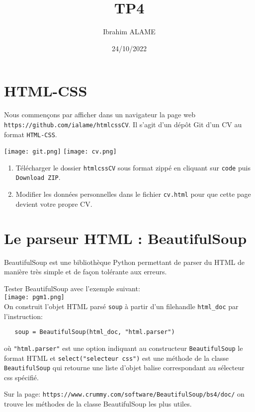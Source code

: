 \documentclass[a4paper]{article}
\title{TP4}
\author{Ibrahim ALAME}
\date{24/10/2022}
\begin{document}
\maketitle
\section{HTML-CSS}%
Nous commençons par afficher dans un navigateur la page web  {\tt https://github.com/ialame/htmlcssCV}. Il s'agit d'un dépôt Git d'un CV au format {\tt HTML-CSS}.

\begin{center}
\texttt{[image: git.png]} 
\texttt{[image: cv.png]} 
\end{center}


\begin{enumerate}
\item Télécharger le dossier {\tt htmlcssCV} sous format zippé en cliquant sur {\tt code} puis {\tt Download ZIP}.
\item Modifier les données personnelles dans le fichier {\tt cv.html}  pour que cette page devient votre propre CV.
\end{enumerate}

\section{Le parseur HTML : BeautifulSoup}
BeautifulSoup est une bibliothèque Python permettant de parser du HTML de manière très simple et de façon tolérante aux erreurs. 

Tester BeautifulSoup avec l'exemple suivant:
\\
\texttt{[image: pgm1.png]} 
\\
On construit l'objet HTML parsé {\tt soup} à partir d'un filehandle  {\tt html\_doc} par l'instruction: 
\begin{verbatim}
   soup = BeautifulSoup(html_doc, "html.parser")
\end{verbatim}
où {\tt "html.parser"} est une option indiquant au constructeur {\tt BeautifulSoup} le format HTML et {\tt select("selecteur css")} est une méthode de la classe {\tt BeautifulSoup} qui retourne une liste d'objet balise correspondant au sélecteur css spécifié.  

Sur la page: {\tt https://www.crummy.com/software/BeautifulSoup/bs4/doc/} on trouve les méthodes de la classe BeautifulSoup les plus utiles.
\end{document}
